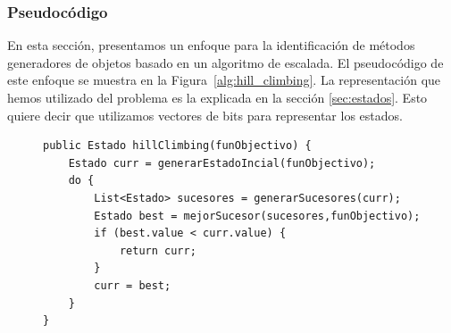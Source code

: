 



\subsubsection{Pseudocódigo}

En esta sección, presentamos un enfoque para la identificación de métodos generadores de objetos basado en un algoritmo de escalada. El pseudocódigo de este enfoque se muestra en la Figura~\ref{alg:hill_climbing}.
La representación que hemos utilizado del problema es la explicada en la sección \ref{sec:estados}. Esto quiere decir que utilizamos vectores de bits para representar los estados. 

\begin{figure}[H]

\begin{lstlisting}[style=javaStyle, caption={Algoritmo de Hill Climbing}, label={alg:hill_climbing}]
public Estado hillClimbing(funObjectivo) {
    Estado curr = generarEstadoIncial(funObjectivo);
    do {
        List<Estado> sucesores = generarSucesores(curr);
        Estado best = mejorSucesor(sucesores,funObjectivo);
        if (best.value < curr.value) {
            return curr;
        }
        curr = best;
    }
}
\end{lstlisting}
\end{figure}


